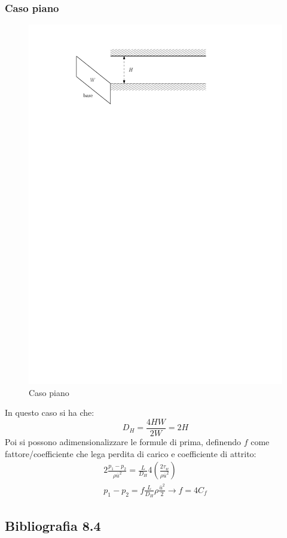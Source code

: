 \subsubsection{Caso piano}
	\begin{figure}[ht]
		\includegraphics[scale=0.7]{./8.4 Perdite di carico/8.4-2}
		\centering
		\caption{Caso piano}
	\end{figure}
%
In questo caso si ha che:
%
	\begin{equation*}
		D_H = \frac{4 H W}{2 W} = 2H
	\end{equation*}
%
Poi si possono adimensionalizzare le formule di prima, definendo $f$ come fattore/coefficiente che lega perdita di carico e coefficiente di attrito:
%
	\begin{equation*}
		\begin{gathered}
			2 \frac{p_1 - p_2}{\rho \bar{u}^2} = \frac{L}{D_H} 4 \left( \frac{2 \tau_w}{\rho \bar{u}^2} \right)\\
			p_1 - p_2 = f \frac{L}{D_H} \rho \frac{\bar{u}^2}{2} \rightarrow f = 4 C_f
		\end{gathered}
	\end{equation*}
%


\subsection*{Bibliografia 8.4}
\cite[Cap.\ 12.4, 12.6]{PnueliGutfinger}